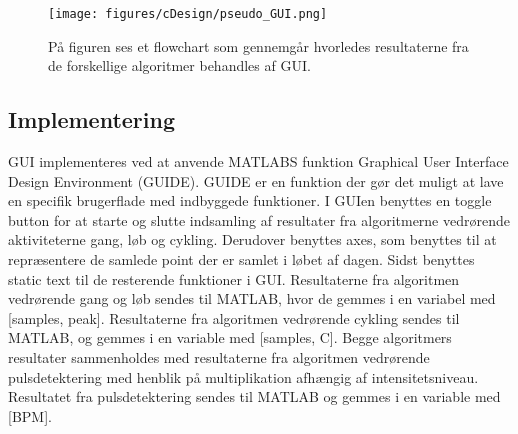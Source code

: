 \begin{figure}[H]
	\centering
	\texttt{[image: figures/cDesign/pseudo\_GUI.png]}
	\caption{På figuren ses et flowchart som gennemgår hvorledes resultaterne fra de forskellige algoritmer behandles af GUI.}
	\label{fig:GUI}
\end{figure}

\subsection{Implementering}
GUI implementeres ved at anvende MATLABS funktion Graphical User Interface Design Environment (GUIDE). GUIDE er en funktion der gør det muligt at lave en specifik brugerflade med indbyggede funktioner. I GUIen benyttes en toggle button for at starte og slutte indsamling af resultater fra algoritmerne vedrørende aktiviteterne gang, løb og cykling. Derudover benyttes axes, som benyttes til at repræsentere de samlede point der er samlet i løbet af dagen. Sidst benyttes static text til de resterende funktioner i GUI. \newline
Resultaterne fra algoritmen vedrørende gang og løb sendes til MATLAB, hvor de gemmes i en variabel med [samples, peak]. Resultaterne fra algoritmen vedrørende cykling sendes til MATLAB, og gemmes i en variable med [samples, C]. Begge algoritmers resultater sammenholdes med resultaterne fra algoritmen vedrørende pulsdetektering med henblik på multiplikation afhængig af intensitetsniveau. Resultatet fra pulsdetektering sendes til MATLAB og gemmes i en variable med [BPM].


